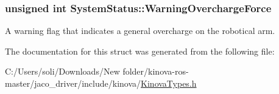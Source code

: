 \subsubsection[{\texorpdfstring{Warning\+Overcharge\+Force}{WarningOverchargeForce}}]{\setlength{\rightskip}{0pt plus 5cm}unsigned int System\+Status\+::\+Warning\+Overcharge\+Force}\hypertarget{struct_system_status_a87405334f1d98467521181af5b58485c}{}\label{struct_system_status_a87405334f1d98467521181af5b58485c}


A warning flag that indicates a general overcharge on the robotical arm. 



The documentation for this struct was generated from the following file\+:\begin{DoxyCompactItemize}
\item 
C\+:/\+Users/soli/\+Downloads/\+New folder/kinova-\/ros-\/master/jaco\+\_\+driver/include/kinova/\hyperlink{_kinova_types_8h}{Kinova\+Types.\+h}\end{DoxyCompactItemize}
